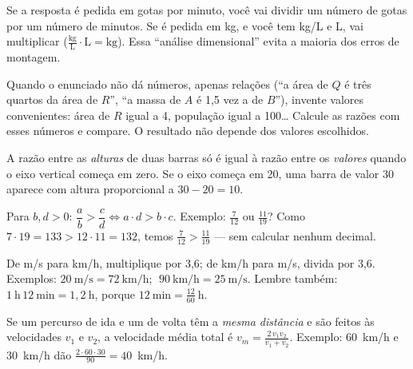 \begin{dica}
Se a resposta é pedida em gotas por minuto, você vai dividir um número de gotas
por um número de minutos. Se é pedida em kg, e você tem kg/L e L, vai multiplicar
($\frac{\text{kg}}{\text{L}} \cdot \text{L} = \text{kg}$). Essa ``análise
dimensional'' evita a maioria dos erros de montagem.
\end{dica}

\begin{dica}
Quando o enunciado não dá números, apenas relações (``a área de $Q$ é três
quartos da área de $R$'', ``a massa de $A$ é 1,5 vez a de $B$''), invente valores
convenientes: área de $R$ igual a 4, população igual a 100\ldots{} Calcule as razões
com esses números e compare. O resultado não depende dos valores escolhidos.
\end{dica}

\begin{dica}
A razão entre as \emph{alturas} de duas barras só é igual à razão entre os
\emph{valores} quando o eixo vertical começa em zero. Se o eixo começa em 20,
uma barra de valor 30 aparece com altura proporcional a $30 - 20 = 10$.
\end{dica}

\begin{macete}
Para $b, d > 0$: $\dfrac{a}{b} > \dfrac{c}{d} \iff a \cdot d > b \cdot c$.
Exemplo: $\frac{7}{12}$ ou $\frac{11}{19}$? Como $7 \cdot 19 = 133 > 12 \cdot 11 = 132$,
temos $\frac{7}{12} > \frac{11}{19}$ — sem calcular nenhum decimal.
\end{macete}

\begin{macete}[km/h e m/s: o fator 3,6]
De m/s para km/h, multiplique por 3,6; de km/h para m/s, divida por 3,6.
Exemplos: $20~\text{m/s} = 72~\text{km/h}$; $\;90~\text{km/h} = 25~\text{m/s}$.
Lembre também: $1~\text{h}\,12~\text{min} = 1{,}2~\text{h}$, porque
$12~\text{min} = \frac{12}{60}~\text{h}$.
\end{macete}

\begin{macete}
Se um percurso de ida e um de volta têm a \emph{mesma distância} e são feitos às
velocidades $v_1$ e $v_2$, a velocidade média total é
$\displaystyle v_m = \frac{2\,v_1 v_2}{v_1 + v_2}$.
Exemplo: 60~km/h e 30~km/h dão $\frac{2 \cdot 60 \cdot 30}{90} = 40$~km/h.
\end{macete}

